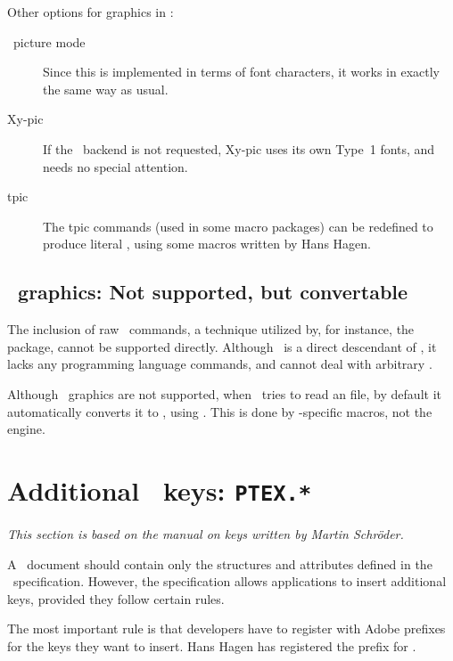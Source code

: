 \documentclass{pdftexmanual}
\begin{document}
Other options for graphics in \PDFTEX:

\begin{description}
\item[\LATEX\ picture mode] Since this is implemented in terms
of font characters, it works in exactly the same way as usual.

\item[Xy-pic] If the \POSTSCRIPT\ backend is not requested, Xy-pic
uses its own Type~1 fonts, and needs no special attention.

\item[tpic] The tpic  commands (used in some
macro packages) can be redefined to produce literal \PDF, using some
macros written by Hans Hagen.

\end{description}

\section{\POSTSCRIPT\ graphics: Not supported, but convertable}

The inclusion of raw \POSTSCRIPT\ commands, a technique utilized by, for
instance, the  package, cannot be supported directly.
Although \PDF\ is a direct descendant of \POSTSCRIPT, it lacks any
programming language commands, and cannot deal with arbitrary
\POSTSCRIPT.

Although \POSTSCRIPT\ graphics are not supported, when \PDFLATEX\ tries
to read an  file, by default it automatically converts it to
, using \EPSTOPDF. This is done by \LATEX-specific macros,
not the \PDFTEX engine.

\chapter{Additional \PDF\ keys: \texttt{PTEX.*}}
\label{sec.addpdfkeys}

{\em This section is based on the manual on keys written by Martin Schr\"oder.}

A \PDF\ document should contain only the structures and attributes defined
in the \PDF\ specification. However, the specification allows applications
to insert additional keys, provided they follow certain rules.

The most important rule is that developers have to register with Adobe
prefixes for the keys they want to insert.  Hans Hagen has registered the
prefix  for \PDFTEX.
\end{document}
